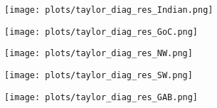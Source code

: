 \begin{figure}[H]
\vspace{-10pt}
\centering
    \begin{subfigure}{0.30\textwidth}
        \texttt{[image: plots/taylor\_diag\_res\_Indian.png]}
        \caption{}
    \end{subfigure}
    \begin{subfigure}{0.30\textwidth}
        \texttt{[image: plots/taylor\_diag\_res\_GoC.png]}
        \caption{}
    \end{subfigure}
    \begin{subfigure}{0.30\textwidth}
        \texttt{[image: plots/taylor\_diag\_res\_NW.png]}
        \caption{}
    \end{subfigure}
  \begin{subfigure}{0.30\textwidth}
     \texttt{[image: plots/taylor\_diag\_res\_SW.png]}
        \caption{}
    \end{subfigure}
    \begin{subfigure}{0.30\textwidth}
        \texttt{[image: plots/taylor\_diag\_res\_GAB.png]}
        \caption{}
    \end{subfigure}
    \begin{subfigure}{0.30\textwidth}


\end{subfigure}
\end{figure}
